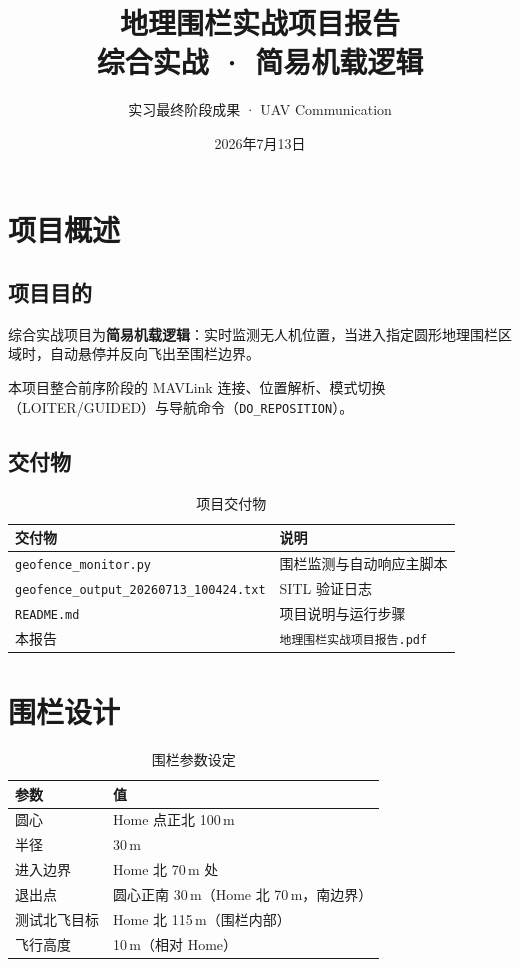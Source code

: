 \documentclass[12pt,a4paper]{article}
\title{\textbf{地理围栏实战项目报告} \\ \large 综合实战 · 简易机载逻辑}
\author{实习最终阶段成果 · UAV Communication}
\date{2026年7月13日}
\begin{document}
\maketitle
\tableofcontents
\newpage

\section{项目概述}

\subsection{项目目的}

综合实战项目为\textbf{简易机载逻辑}：实时监测无人机位置，当进入指定圆形地理围栏区域时，自动悬停并反向飞出至围栏边界。

本项目整合前序阶段的 MAVLink 连接、位置解析、模式切换（LOITER/GUIDED）与导航命令（\texttt{DO\_REPOSITION}）。

\subsection{交付物}

\begin{table}[htbp]
\centering
\caption{项目交付物}
\begin{tabular}{p{4.5cm}p{8.5cm}}
\toprule
\textbf{交付物} & \textbf{说明} \\
\midrule
\texttt{geofence\_monitor.py} & 围栏监测与自动响应主脚本 \\
\texttt{geofence\_output\_20260713\_100424.txt} & SITL 验证日志 \\
\texttt{README.md} & 项目说明与运行步骤 \\
本报告 & \texttt{地理围栏实战项目报告.pdf} \\
\bottomrule
\end{tabular}
\end{table}

\section{围栏设计}

\begin{table}[htbp]
\centering
\caption{围栏参数设定}
\begin{tabular}{ll}
\toprule
\textbf{参数} & \textbf{值} \\
\midrule
圆心 & Home 点正北 100\,m \\
半径 & 30\,m \\
进入边界 & Home 北 70\,m 处 \\
退出点 & 圆心正南 30\,m（Home 北 70\,m，南边界） \\
测试北飞目标 & Home 北 115\,m（围栏内部） \\
飞行高度 & 10\,m（相对 Home） \\
\bottomrule
\end{tabular}
\end{table}
\end{document}
